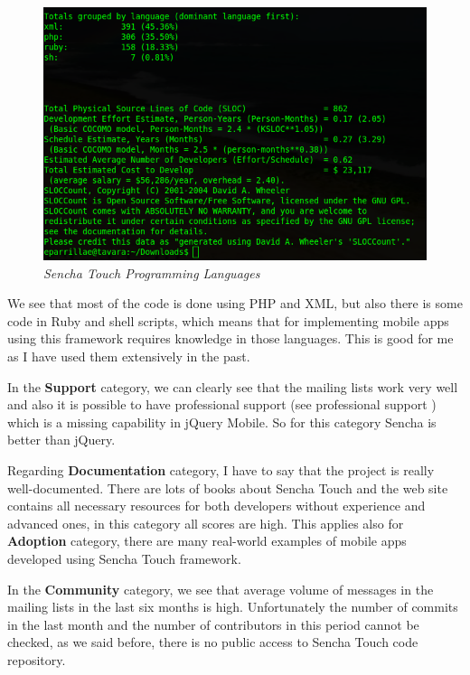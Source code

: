 \documentclass[a4paper,12pt]{book}
\begin{document}
\begin{figure}[H]
    \centering
    \includegraphics[width=15cm, keepaspectratio]{img/senchasloccount.png}
    \caption{\textit{Sencha Touch Programming Languages}}
    \label{figure:jquerylanguages}
 \end{figure}

We see that most of the code is done using PHP and XML, but also there is some code in Ruby and shell scripts, which means that for implementing mobile apps using this framework requires knowledge in those languages. This is good for me as I have used them extensively in the past.

In the \textbf{Support} category, we can clearly see that the mailing lists work very well and also it is possible to have professional support (see professional support \cite{sencha support}) which is a missing capability in jQuery Mobile. So for this category Sencha is better than jQuery.

Regarding \textbf{Documentation} category, I have to say that the project is really well-documented. There are lots of books about Sencha Touch and the web site contains all necessary resources for both developers without experience and advanced ones, in this category all scores are high. This applies also for \textbf{Adoption} category, there are many real-world examples of mobile apps developed using Sencha Touch framework.

In the \textbf{Community} category, we see that average volume of messages in the mailing lists in the last six months is high. Unfortunately the number of commits in the last month and the number of contributors in this period cannot be checked, as we said before, there is no public access to Sencha Touch code repository. 
\end{document}
